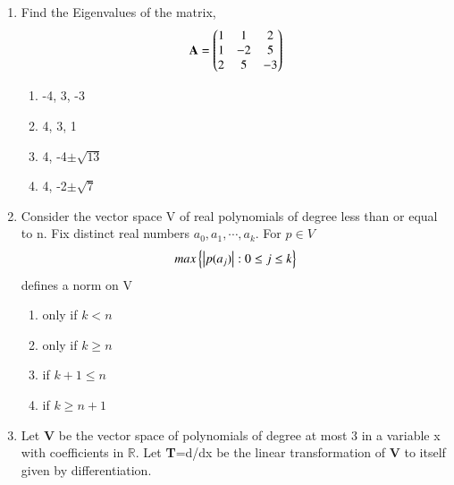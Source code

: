 \begin{enumerate}[label=\thesection.\arabic*.,ref=\thesection.\theenumi]
%
\item Find the Eigenvalues of the matrix,
\begin{align}
\mathbf{A} = \begin{pmatrix}1 & 1 & 2 \\ 1 & -2 & 5 \\ 2 & 5 & -3 \end{pmatrix}\label{eq:solutions/2017/june/32/eq:1}
\end{align}
\begin{enumerate}
\item -4, 3, -3
\item 4, 3, 1
\item 4, -4$\pm\sqrt{13}$
\item 4, -2$\pm\sqrt{7}$
\end{enumerate}
%
%
\solution

\item Consider the vector space V of real polynomials of degree less than or equal to n. Fix distinct real numbers $a_0, a_1, \cdots, a_k$. For $p \in V$
\begin{align}
    max\left\{\left\vert p(a_j)\right\vert: 0\leq j \leq k\right\}
\end{align}
defines a norm on V
\begin{enumerate}
    \item only if $k<n$
    \item only if $k\ge n$
    \item if $ k+1\leq n$ 
    \item if $k \ge n+1$
\end{enumerate}
%
\solution

\item Let \textbf{V} be the vector space of polynomials of degree at most 3 in a variable x with coefficients in $\mathbb{R}$. Let \textbf{T}=d/dx be the linear transformation of \textbf{V} to itself given by differentiation.\\


\end{enumerate}
